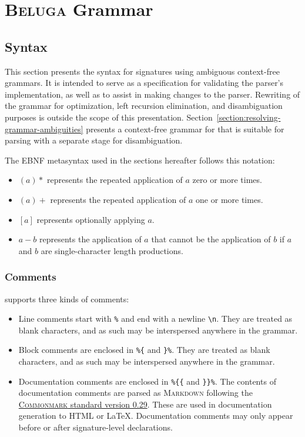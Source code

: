 \chapter{\textsc{Beluga} Grammar}


\section{Syntax}\label{section:syntax}

This section presents the syntax for \Beluga signatures using ambiguous context-free grammars.
It is intended to serve as a specification for validating the parser's implementation, as well as to assist in making changes to the parser.
Rewriting of the grammar for optimization, left recursion elimination, and disambiguation purposes is outside the scope of this presentation.
Section~\ref{section:resolving-grammar-ambiguities} presents a context-free grammar for \Beluga that is suitable for parsing with a separate stage for disambiguation.

The \ac{EBNF} metasyntax used in the sections hereafter follows this notation:

\begin{itemize}
\item $ (a)* $ represents the repeated application of $ a $ zero or more times.
\item $ (a)+ $ represents the repeated application of $ a $ one or more times.
\item $ [a] $ represents optionally applying $ a $.
\item $ a - b $ represents the application of $ a $ that cannot be the application of $ b $ if $ a $ and $ b $ are single-character length productions.
\end{itemize}

\subsection{Comments}

\Beluga supports three kinds of comments:

\begin{itemize}
\item
Line comments start with \texttt{\%} and end with a newline \texttt{\textbackslash n}.
They are treated as blank characters, and as such may be interspersed anywhere in the grammar.
\item
Block comments are enclosed in \texttt{\%\{} and \texttt{\}\%}.
They are treated as blank characters, and as such may be interspersed anywhere in the grammar.
\item
Documentation comments are enclosed in \texttt{\%\{\{} and \texttt{\}\}\%}.
The contents of documentation comments are parsed as \textsc{Markdown} following the \href{https://spec.commonmark.org/0.29}{\textsc{Commonmark} standard version 0.29}.
These are used in documentation generation to \textsc{HTML} or \LaTeX.
Documentation comments may only appear before or after signature-level declarations.
\end{itemize}

